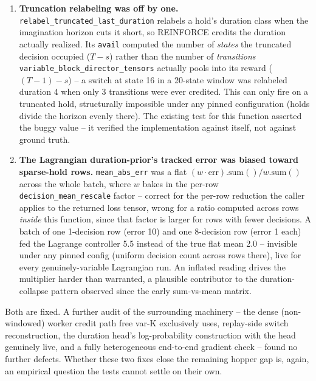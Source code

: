 \documentclass[10pt]{article}
\begin{document}
\begin{enumerate}
\item \textbf{Truncation relabeling was off by one.}
\texttt{relabel\_truncated\_last\_duration} relabels a hold's duration class
when the imagination horizon cuts it short, so REINFORCE credits the duration
actually realized. Its \texttt{avail} computed the number of \emph{states}
the truncated decision occupied ($T - s$) rather than the number of
\emph{transitions} \texttt{variable\_block\_director\_tensors} actually pools
into its reward ($(T{-}1) - s$) -- a switch at state 16 in a 20-state window
was relabeled duration 4 when only 3 transitions were ever credited. This can
only fire on a truncated hold, structurally impossible under any pinned
configuration (holds divide the horizon evenly there). The existing test for
this function asserted the buggy value -- it verified the implementation
against itself, not against ground truth.
\item \textbf{The Lagrangian duration-prior's tracked error was biased toward
sparse-hold rows.} \texttt{mean\_abs\_err} was a flat
$(w\!\cdot\!\mathrm{err}).\mathrm{sum}() / w.\mathrm{sum}()$ across the whole
batch, where $w$ bakes in the per-row \texttt{decision\_mean\_rescale}
factor -- correct for the per-row reduction the caller applies to the
returned loss tensor, wrong for a ratio computed across rows \emph{inside}
this function, since that factor is larger for rows with fewer decisions. A
batch of one 1-decision row (error 10) and one 8-decision row (error 1 each)
fed the Lagrange controller 5.5 instead of the true flat mean 2.0 -- invisible
under any pinned config (uniform decision count across rows there), live for
every genuinely-variable Lagrangian run. An inflated reading drives the
multiplier harder than warranted, a plausible contributor to the
duration-collapse pattern observed since the early sum-vs-mean matrix.
\end{enumerate}

Both are fixed. A further audit of the surrounding machinery -- the dense
(non-windowed) worker credit path free var-K exclusively uses, replay-side
switch reconstruction, the duration head's log-probability construction with
the head genuinely live, and a fully heterogeneous end-to-end gradient
check -- found no further defects. Whether these two fixes close the
remaining hopper gap is, again, an empirical question the tests cannot
settle on their own.
\end{document}
